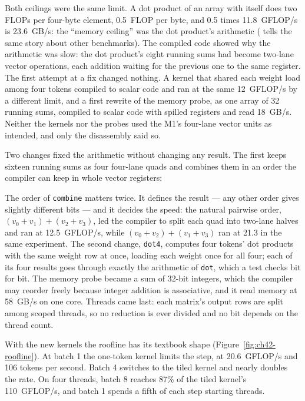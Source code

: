 Both ceilings were the same limit. A dot product of an array with itself does
two FLOPs per four-byte element, 0.5~FLOP per byte, and 0.5 times 11.8~GFLOP/s
is 23.6~GB/s: the ``memory ceiling'' was the dot product's arithmetic
( tells the same story about other benchmarks). The
compiled code showed why the arithmetic was slow: the dot product's eight running
sums had become two-lane vector operations, each addition waiting for the
previous one to the same register. The first attempt at a fix changed nothing. A
kernel that shared each weight load among four tokens compiled to scalar code
and ran at the same 12~GFLOP/s by a different limit, and a first rewrite of the
memory probe, as one array of 32 running sums, compiled to scalar code with
spilled registers and read 18~GB/s. Neither the kernels nor the probes used the
M1's four-lane vector units as intended, and only the disassembly said so.

Two changes fixed the arithmetic without changing any result. The first keeps
sixteen running sums as four four-lane quads and combines them in an order the
compiler can keep in whole vector registers:


The order of \texttt{combine} matters twice. It defines the result --- any other
order gives slightly different bits --- and it decides the speed: the natural
pairwise order, $(v_0 + v_1) + (v_2 + v_3)$, led the compiler to split each quad
into two-lane halves and ran at 12.5~GFLOP/s, while $(v_0 + v_2) + (v_1 + v_3)$
ran at 21.3 in the same experiment. The second change, \texttt{dot4}, computes
four tokens' dot products with the same weight row at once, loading each weight
once for all four; each of its four results goes through exactly the arithmetic
of \texttt{dot}, which a test checks bit for bit. The memory probe became a sum of
32-bit integers, which the compiler may reorder freely because integer addition
is associative, and it read memory at 58~GB/s on one core. Threads came last:
each matrix's output rows are split among scoped threads, so no reduction is
ever divided and no bit depends on the thread count.

With the new kernels the roofline has its textbook shape
(Figure~\ref{fig:ch42-roofline}). At batch 1 the one-token kernel limits the
step, at 20.6~GFLOP/s and 106 tokens per second. Batch 4 switches to the tiled
kernel and nearly doubles the rate. On four threads, batch 8 reaches 87\% of the
tiled kernel's 110~GFLOP/s, and batch 1 spends a fifth of each step starting
threads.

